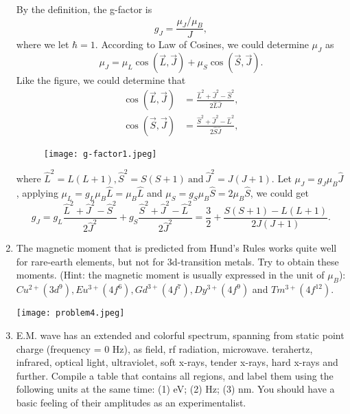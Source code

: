 \documentclass[reqno,a4paper,12pt]{amsart}
\begin{document}
\begin{enumerate}[1]
\begin{tcolorbox}[colback = black!5!white, colframe = black, breakable]
By the definition, the g-factor is 
\begin{equation*}
	g_J = \frac{\mu_J/\mu_B}{J},
\end{equation*}
where we let $\hbar = 1$. According to Law of Cosines, we could determine $\mu_J$ as 
\[
	\mu_J = \mu_L \cos(\vec{L},\vec{J}) + \mu_S \cos(\vec{S},\vec{J}).
\]
Like the figure, we could determine that 
\begin{align*}
	\cos(\vec{L},\vec{J}) &= \frac{\hat{L}^2 + \hat{J}^2 - \hat{S}^2}{2\hat{L}\hat{J}}, \\
	\cos(\vec{S},\vec{J}) &= \frac{\hat{S}^2 + \hat{J}^2 - \hat{L}^2}{2\hat{S}\hat{J}},
\end{align*}
\begin{figure}[H]
	\begin{center}
		\texttt{[image: g-factor1.jpeg]}
	\end{center}
\end{figure}
where $\hat{L}^2 = L(L+1), \hat{S}^2 = S(S+1) ~\text{and}~ \hat{J}^2 = J(J+1)$. Let $\mu_J = g_J\mu_B\hat{J}$, applying $\mu_L = g_L\mu_B\hat{L} = \mu_B\hat{L}$ and $\mu_S = g_S\mu_B\hat{S} = 2\mu_B\hat{S}$, we could get 
\[
	g_J = g_L \frac{\hat{L}^2 + \hat{J}^2 - \hat{S}^2}{2\hat{J}^2} + g_S \frac{\hat{S}^2 + \hat{J}^2 - \hat{L}^2}{2\hat{J}^2} = \frac{3}{2} + \frac{S(S+1) - L(L+1)}{2J(J+1)}.
\]

\end{tcolorbox}


\item The magnetic moment that is predicted from Hund’s Rules works quite well for rare-earth elements, but not for 3d-transition metals. Try to obtain these moments. (Hint: the magnetic moment is usually expressed in the unit of $\mu_B$): $Cu^{2+} (3d^9), Eu^{3+} (4f^6), Gd^{3+} (4f^{7}), Dy^{3+} (4f^{9})$ and $Tm^{3+} (4f^{12})$.

\begin{tcolorbox}[colback = black!5!white, colframe = black]
\begin{center}
	\texttt{[image: problem4.jpeg]}
\end{center}

\end{tcolorbox}


\item E.M. wave has an extended and colorful spectrum, spanning from static point charge (frequency = 0 Hz), as field, rf radiation, microwave. terahertz, infrared, optical light, ultraviolet, soft x-rays, tender x-rays, hard x-rays and further. Compile a table that contains all regions, and label them using the following units at the same time: (1) eV; (2) Hz; (3) nm. You should have a basic feeling of their amplitudes as an experimentalist.


\end{enumerate}
\end{document}
